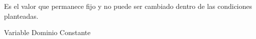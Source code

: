 
\question Es el valor que permanece fijo y no puede ser cambiado dentro de
las condiciones planteadas.

  \begin{oneparchoices}
    \choice Variable
    \choice Dominio
    \choice Constante
  \end{oneparchoices}
